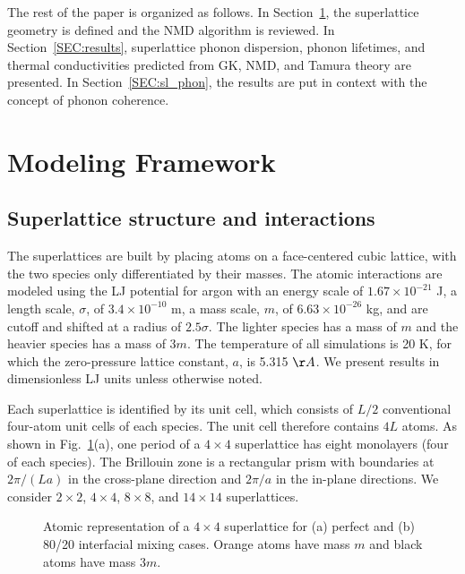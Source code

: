 \documentclass[aps,prb,preprint,preprintnumbers,amsmath,amssymb,floatfix,superscriptaddress]{revtex4}
\begin{document}
The rest of the paper is organized as follows. In Section~\ref{SEC:modeling}, the superlattice geometry is defined and the NMD algorithm is reviewed. In Section~\ref{SEC:results}, superlattice phonon dispersion, phonon lifetimes, and thermal conductivities predicted from GK, NMD, and Tamura theory are presented. In Section~\ref{SEC:sl_phon}, the results are put in context with the concept of phonon coherence.

\section{Modeling Framework}\label{SEC:modeling}
\subsection{Superlattice structure and interactions}\label{SEC:sl_struc}
The superlattices are built by placing atoms on a face-centered cubic lattice, with the two species only differentiated by their masses. The atomic interactions are modeled using the LJ potential for argon with an energy scale of $1.67\times10^{-21}$ J, a length scale, $\sigma$, of $3.4\times10^{-10}$ m, a mass scale, $m$, of $6.63\times10^{-26}$ kg, and are cutoff and shifted at a radius of $2.5\sigma$. The lighter species has a mass of $m$ and the heavier species has a mass of $3m$. The temperature of all simulations is 20 K, for which the zero-pressure lattice constant, $a$, is 5.315 $\AA$.\cite{PhysRevB.69.094303} We present results in dimensionless LJ units unless otherwise noted. 

Each superlattice is identified by its unit cell, which consists of $L/2$ conventional four-atom unit cells of each species. The unit cell therefore contains $4L$ atoms. As shown in Fig.~\ref{fig:md_domain}(a), one period of a $4\times4$ superlattice has eight monolayers (four of each species). The Brillouin zone is a rectangular prism with boundaries at $2\pi/(La)$ in the cross-plane direction and $2\pi/a$ in the in-plane directions. We consider $2\times2$, $4\times4$, $8\times8$, and $14\times14$ superlattices.
\begin{figure}[t!]
\begin{center}
\renewcommand{\figure}{Fig.}
\caption{Atomic representation of a $4\times4$ superlattice for (a) perfect and (b) 80/20 interfacial mixing cases. Orange atoms have mass  $m$ and black atoms have mass $3m$.}
\label{fig:md_domain}
\end{center}
\end{figure}
\end{document}
